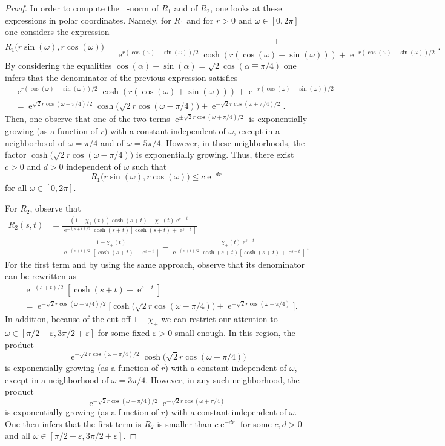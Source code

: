 \documentclass[10pt,a4paper]{amsart}
\def\e{\mathop{\mathrm{e}}\nolimits}
\def\ltwo{\mathop{\mathrm{L}^2}\nolimits}
\begin{document}
\begin{proof}
In order to compute the $\ltwo$-norm of $R_1$ and of $R_2$, one looks at these expressions in polar coordinates. Namely, for $R_1$ and for $r>0$ and $\omega \in [0,2\pi]$ one considers  the expression
$$
R_1\big(r\sin(\omega),r\cos(\omega)\big)=
\frac{1}{\e^{r(\cos(\omega)-\sin(\omega))/2}\cosh(r(\cos(\omega)+\sin(\omega)))+\e^{-r(\cos(\omega)-\sin(\omega))/2}}.
$$
By considering the equalities $\cos(\alpha)\pm\sin(\alpha)=\sqrt{2}\cos(\alpha\mp\pi/4)$
one infers that
the denominator of the previous expression satisfies
\begin{align*}
& \e^{r(\cos(\omega)-\sin(\omega))/2}\cosh(r(\cos(\omega)+\sin(\omega)))+\e^{-r(\cos(\omega)-\sin(\omega))/2} \\
& =\e^{\sqrt{2}r\cos(\omega+\pi/4)/2}\cosh\big(\sqrt{2}r\cos(\omega-\pi/4)\big)+\e^{-\sqrt{2}r\cos(\omega+\pi/4)/2}.
\end{align*}
Then, one observe that one of the two terms $\e^{\pm\sqrt{2}r\cos(\omega+\pi/4)/2}$ is exponentially growing (as a function of $r$) with a constant independent of $\omega$, except in a neighborhood of $\omega=\pi/4$ and of $\omega=5\pi/4$.
However, in these neighborhoods, the factor $\cosh\big(\sqrt{2}r\cos(\omega-\pi/4)\big)$ is exponentially growing. Thus, there exist $c>0$ and $d>0$ independent of $\omega$ such that
$$
R_1\big(r\sin(\omega),r\cos(\omega)\big)\leq c\e^{-dr}
$$
for all $\omega \in [0,2\pi]$. 

For $R_2$, observe that
\begin{align*}
R_2(s,t) & = \frac{(1-\chi_+(t))\cosh(s+t)-\chi_+(t)\e^{s-t}}{\e^{-(s+t)/2}\cosh(s+t)[\cosh(s+t)+\e^{s-t}]} \\
& = \frac{1-\chi_+(t)}{\e^{-(s+t)/2}[\cosh(s+t)+\e^{s-t}]}-\frac{\chi_+(t)\e^{s-t}}{\e^{-(s+t)/2}\cosh(s+t)[\cosh(s+t)+\e^{s-t}]}.
\end{align*}
For the first term and by using the same approach, observe that its denominator
can be rewritten as
\begin{align*}
&\e^{-(s+t)/2}[\cosh(s+t)+\e^{s-t}] \\
&=\e^{-\sqrt{2}r\cos(\omega-\pi/4)/2}
\big[\cosh\big(\sqrt{2}r \cos(\omega-\pi/4)\big)+\e^{-\sqrt{2}r\cos(\omega+\pi/4)}\big].
\end{align*}
In addition, because of the cut-off $1-\chi_+$ we can restrict our attention
to $\omega \in [\pi/2-\varepsilon,3\pi/2+\varepsilon]$ for some fixed $\varepsilon>0$
small enough.  In this region, the product 
$$
\e^{-\sqrt{2}r\cos(\omega-\pi/4)/2} \cosh\big(\sqrt{2}r \cos(\omega-\pi/4)\big)
$$ 
is exponentially growing (as a function of $r$) with a constant independent of $\omega$, except in a neighborhood of $\omega=3\pi/4$.
However, in any such neighborhood, the product
$$
\e^{-\sqrt{2}r\cos(\omega-\pi/4)/2}\e^{-\sqrt{2}r\cos(\omega+\pi/4)}
$$
is exponentially growing (as a function of $r$) with a constant independent of $\omega$.
One then infers that the first term is $R_2$ is smaller than $c\e^{-dr}$ for some
$c,d>0$ and all $\omega \in [\pi/2-\varepsilon,3\pi/2+\varepsilon]$.


\end{proof}
\end{document}

